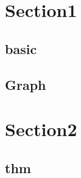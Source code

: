 \section{Section1}
    \subsection{basic}
        
    \subsection{Graph}
        

\section{Section2}
    \subsection{thm}
        